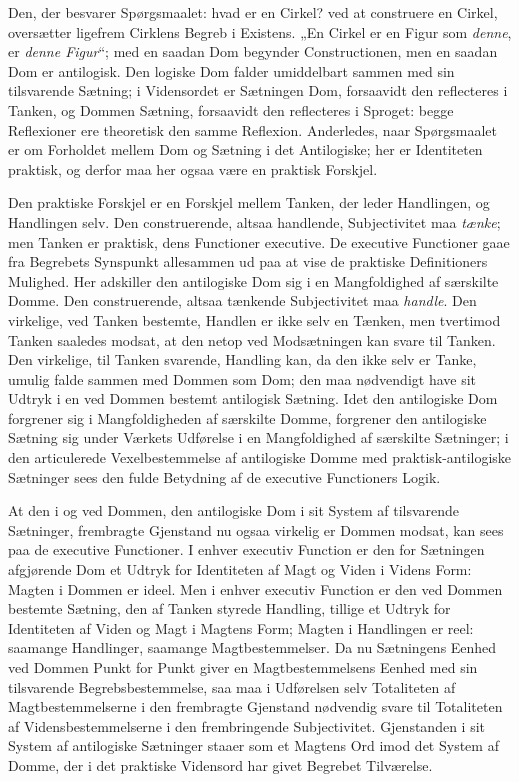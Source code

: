 \documentclass[12pt]{book}
\newcommand{\opage}[1]{\marginnote{\footnotesize\textit{[#1]}}}
\begin{document}
Den, der besvarer Spørgsmaalet: hvad er en Cirkel?
ved at construere en Cirkel, oversætter ligefrem Cirklens Begreb
i Existens. „En Cirkel er en Figur som \emph{denne}, er
\emph{denne Figur}“; med en saadan Dom begynder Constructionen,
men en saadan Dom er antilogisk. Den logiske Dom
falder umiddelbart sammen med sin tilsvarende Sætning; i
Vidensordet er Sætningen Dom, forsaavidt den reflecteres i
Tanken, og Dommen Sætning, forsaavidt den reflecteres i
Sproget: begge Reflexioner ere theoretisk den samme Reflexion.
Anderledes, naar Spørgsmaalet er om Forholdet
mellem Dom og Sætning i det Antilogiske; her er Identiteten
praktisk, og derfor maa her ogsaa være en praktisk
Forskjel.

Den praktiske Forskjel er en Forskjel mellem Tanken,
der leder Handlingen, og Handlingen selv. Den construerende,
altsaa handlende, Subjectivitet maa \emph{tænke}; men Tanken er
praktisk, dens Functioner executive. De executive Functioner
gaae fra Begrebets Synspunkt allesammen ud paa at
vise de praktiske Definitioners Mulighed. Her adskiller den
antilogiske Dom sig i en Mangfoldighed af særskilte Domme.
Den construerende, altsaa tænkende Subjectivitet maa \emph{handle}.
\opage{137}Den virkelige, ved Tanken bestemte, Handlen er ikke selv en
Tænken, men tvertimod Tanken saaledes modsat, at den netop
ved Modsætningen kan svare til Tanken. Den virkelige, til
Tanken svarende, Handling kan, da den ikke selv er Tanke,
umulig falde sammen med Dommen som Dom; den maa
nødvendigt have sit Udtryk i en ved Dommen bestemt antilogisk
Sætning. Idet den antilogiske Dom forgrener sig i
Mangfoldigheden af særskilte Domme, forgrener den antilogiske
Sætning sig under Værkets Udførelse i en Mangfoldighed af
særskilte Sætninger; i den articulerede Vexelbestemmelse af
antilogiske Domme med praktisk-antilogiske Sætninger sees den
fulde Betydning af de executive Functioners Logik.

At den i og ved Dommen, den antilogiske Dom i sit
System af tilsvarende Sætninger, frembragte Gjenstand nu
ogsaa virkelig er Dommen modsat, kan sees paa de executive
Functioner. I enhver executiv Function er den for Sætningen
afgjørende Dom et Udtryk for Identiteten af Magt
og Viden i Videns Form: Magten i Dommen er ideel.
Men i enhver executiv Function er den ved Dommen bestemte
Sætning, den af Tanken styrede Handling, tillige et
Udtryk for Identiteten af Viden og Magt i Magtens Form;
Magten i Handlingen er reel: saamange Handlinger, saamange
Magtbestemmelser. Da nu Sætningens Eenhed ved Dommen
Punkt for Punkt giver en Magtbestemmelsens Eenhed med sin
tilsvarende Begrebsbestemmelse, saa maa i Udførelsen selv
Totaliteten af Magtbestemmelserne i den frembragte Gjenstand
nødvendig svare til Totaliteten af Vidensbestemmelserne i den
frembringende Subjectivitet. Gjenstanden i sit System af
antilogiske Sætninger staaer som et Magtens Ord imod det
System af Domme, der i det praktiske Vidensord har givet
Begrebet Tilværelse.
\end{document}
